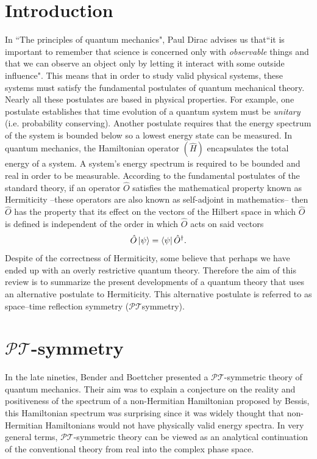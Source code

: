 \documentclass[12pt, a4paper]{report}
\newcommand\PT{\(\mathcal{PT}\)}
\begin{document}
\tableofcontents %

\chapter{Introduction}\label{Introduction}
In ``The principles of quantum mechanics", Paul Dirac advises us that``it is important to remember that science is concerned only with \textit{observable} things and that we can observe an object only by letting it interact with some outside influence"\cite{POQM}. This means that in order to study valid physical systems, these systems must satisfy the fundamental postulates of quantum mechanical theory. Nearly all these postulates are based in physical properties. For example, one postulate establishes that time evolution of a quantum system must be \textit{unitary} (i.e. probability conserving). Another postulate requires that the energy spectrum of the system is bounded below so a lowest energy state can be measured. In quantum mechanics, the Hamiltonian operator $(\hat{H})$ encapsulates the total energy of a system. A system's energy spectrum is required to be bounded and real in order to be measurable. According to the fundamental postulates of the standard theory, if an operator $\hat{O}$ satisfies the mathematical property known as Hermiticity --these operators are also known as self-adjoint in mathematics-- then $\hat{O}$  has the property that its effect on the vectors of the Hilbert space in which $\hat{O}$ is defined is independent of the order in which $\hat{O}$ acts on said vectors\cite{Jones-Smith}
\begin{equation}\label{eq:1.1}
\hat{O}\ket{\psi} = \bra{\psi}\hat{O}^{\dagger}.
\end{equation}
Despite of the correctness of Hermiticity, some believe that perhaps we have ended up with an overly restrictive quantum theory. Therefore the aim of this review is to summarize the present developments of a quantum theory that uses an alternative postulate to Hermiticity. This alternative postulate is referred to as space–time reflection symmetry (\PT\:symmetry)\cite{MustaHbeHermitian}. 


\chapter{\texorpdfstring{$\mathcal{PT}$}\:-symmetry}\label{PT}
In the late nineties, Bender and Boettcher \cite{RealSpectrainNHH} presented a \PT-symmetric theory of quantum mechanics. Their aim was to explain a conjecture on the reality and positiveness of the spectrum of a non-Hermitian Hamiltonian proposed by Bessis, this Hamiltonian spectrum was surprising since it was widely thought that non-Hermitian Hamiltonians would not have physically valid energy spectra. In very general terms, \PT-symmetric theory can be viewed as an analytical continuation of the conventional theory from real into the complex phase space\cite{PTsymmetricQM}.
\end{document}
